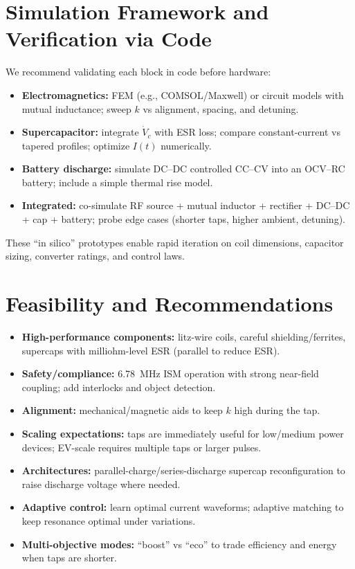 \documentclass[11pt]{article}
\begin{document}
\section{Simulation Framework and Verification via Code}
We recommend validating each block in code before hardware:
\begin{itemize}
  \item \textbf{Electromagnetics:} FEM (e.g., COMSOL/Maxwell) or circuit models with mutual inductance; sweep $k$ vs alignment, spacing, and detuning.
  \item \textbf{Supercapacitor:} integrate $\dot V_c$ with ESR loss; compare constant-current vs tapered profiles; optimize $I(t)$ numerically.
  \item \textbf{Battery discharge:} simulate DC--DC controlled CC--CV into an OCV--RC battery; include a simple thermal rise model.
  \item \textbf{Integrated:} co-simulate RF source + mutual inductor + rectifier + DC--DC + cap + battery; probe edge cases (shorter taps, higher ambient, detuning).
\end{itemize}
These ``in silico'' prototypes enable rapid iteration on coil dimensions, capacitor sizing, converter ratings, and control laws.

\section{Feasibility and Recommendations}
\begin{itemize}
  \item \textbf{High-performance components:} litz-wire coils, careful shielding/ferrites, supercaps with milliohm-level ESR (parallel to reduce ESR).
  \item \textbf{Safety/compliance:} 6.78~MHz ISM operation with strong near-field coupling; add interlocks and object detection.
  \item \textbf{Alignment:} mechanical/magnetic aids to keep $k$ high during the tap.
  \item \textbf{Scaling expectations:} taps are immediately useful for low/medium power devices; EV-scale requires multiple taps or larger pulses.
  \item \textbf{Architectures:} parallel-charge/series-discharge supercap reconfiguration to raise discharge voltage where needed.
  \item \textbf{Adaptive control:} learn optimal current waveforms; adaptive matching to keep resonance optimal under variations.
  \item \textbf{Multi-objective modes:} ``boost'' vs ``eco'' to trade efficiency and energy when taps are shorter.
\end{itemize}
\end{document}
